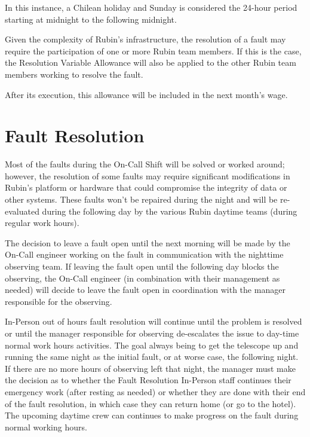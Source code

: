 In this instance, a Chilean holiday and Sunday is considered the 24-hour period starting at midnight to the following midnight.

Given the complexity of Rubin's infrastructure, the resolution of a fault may require the participation of one or more Rubin team members. If this is the case, the Resolution Variable Allowance will also be applied to the other Rubin team members working to resolve the fault.

After its execution, this allowance will be included in the next month's wage.


\section{Fault Resolution}

Most of the faults during the On-Call Shift will be solved or worked around; however, the resolution of some faults may require significant modifications in Rubin's platform or hardware that could compromise the integrity of data or other systems. These faults won't be repaired during the night and will be re-evaluated during the following day by the various Rubin daytime teams (during regular work hours).

The decision to leave a fault open until the next morning will be made by the On-Call engineer working on the fault in communication with the nighttime observing team. If leaving the fault open until the following day blocks the observing, the On-Call engineer (in combination with their management as needed) will decide to leave the fault open in coordination with the manager responsible for the observing.

In-Person out of hours fault resolution will continue until the problem is resolved or until the manager responsible for observing de-escalates the issue to day-time normal work hours activities.  The goal always being to get the telescope up and running the same night as the initial fault, or at worse case, the following night.  If there are no more hours of observing left that night, the manager must make the decision as to whether the Fault Resolution In-Person staff continues their emergency work (after resting as needed) or whether they are done with their end of the fault resolution, in which case they can return home (or go to the hotel).  The upcoming daytime crew can continues to make progress on the fault during normal working hours.



